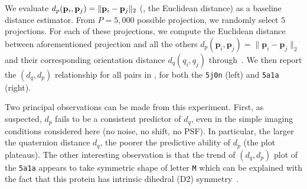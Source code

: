 We evaluate $d_p(\mathbf{p}_i, \mathbf{p}_j) = \Vert \mathbf{p}_i - \mathbf{p}_j \Vert_2$ (\ie, the Euclidean distance) as a baseline distance estimator.
From $P = 5,000$ possible projection, we randomly select $5$ projections.
For each of these projections, we compute the Euclidean distance between aforementioned projection and all the others $d_p(\mathbf{p}_i,\mathbf{p}_j)=\lVert\mathbf{p}_i-\mathbf{p}_j\rVert_2$ and their corresponding orientation distance $d_q(q_i,q_j)$ through~.
We then report the $(d_q,d_p)$ relationship for all pairs in , for both the \texttt{5j0n} (left) and \texttt{5a1a} (right).

Two principal observations can be made from this experiment.
First, as suspected, $d_p$ fails to be a consistent predictor of $d_q$, even in the simple imaging conditions considered here (no noise, no shift, no PSF).
In particular, the larger the quaternion distance $d_q$, the poorer the predictive ability of $d_p$ (the plot plateaus).
The other interesting observation is that the trend of $(d_q,d_p)$ plot of the \texttt{5a1a} appears to take symmetric shape of letter \texttt{M} which can be explained with the fact that this protein has intrinsic dihedral (D2) symmetry~\cite{noauthor_d2sym_nodate,noauthor_5a1asym_nodate}.

